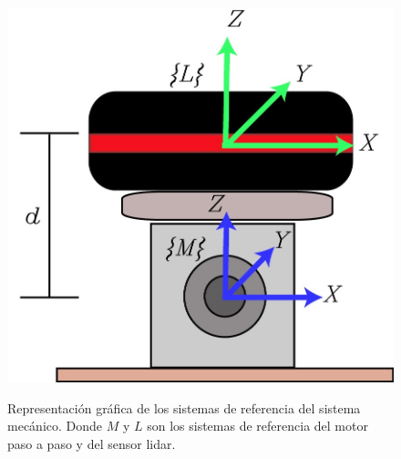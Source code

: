 \begin{figure}[ht!]
\centering \footnotesize
 {\includegraphics[width=0.55\linewidth]{images/lidar_kbki.jpg}}
 \captionsetup{font=footnotesize}
 \caption{Representación gráfica de los sistemas de referencia del sistema 
 mecánico. Donde $M$ y $L$ son los sistemas de referencia del motor paso a 
 paso y del sensor lidar.}
\label{f:FrameSitemaMecanico}
\end{figure}


